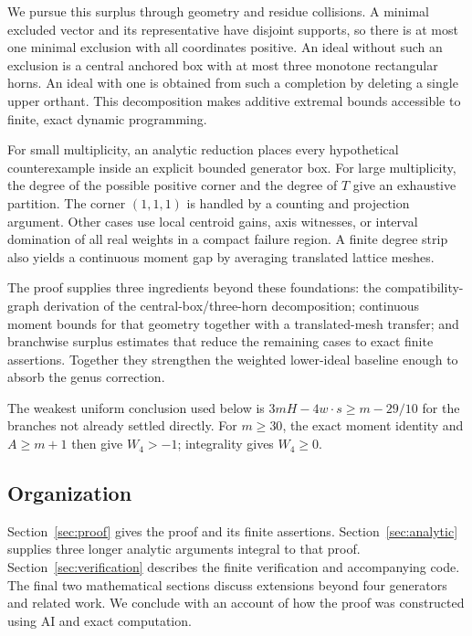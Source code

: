 We pursue this surplus through geometry and residue collisions. A minimal
excluded vector and its representative have disjoint supports, so there
is at most one minimal exclusion with all coordinates positive. An ideal
without such an exclusion is a central anchored box with at most three
monotone rectangular horns. An ideal with one is obtained from such a
completion by deleting a single upper orthant. This decomposition makes
additive extremal bounds accessible to finite, exact dynamic programming.

For small multiplicity, an analytic reduction places every hypothetical
counterexample inside an explicit bounded generator box. For large
multiplicity, the degree of the possible positive corner and the degree
of \(T\) give an exhaustive partition. The corner \((1,1,1)\) is handled
by a counting and projection argument. Other cases use local centroid
gains, axis witnesses, or interval domination of all real weights in a
compact failure region. A finite degree strip also yields a continuous
moment gap by averaging translated lattice meshes.

The proof supplies three ingredients beyond these foundations: the
compatibility-graph derivation of the central-box/three-horn decomposition;
continuous moment bounds for that geometry together with a translated-mesh
transfer; and branchwise surplus estimates that reduce the remaining cases to
exact finite assertions.
Together they strengthen the weighted lower-ideal baseline enough to absorb
the genus correction.

The weakest uniform conclusion used below is
\(3mH-4w\cdot s\ge m-29/10\) for the branches not already settled
directly. For \(m\ge30\), the exact moment identity and \(A\ge m+1\)
then give \(W_4>-1\); integrality gives \(W_4\ge0\).

\subsection{Organization}

Section~\ref{sec:proof} gives the proof and its finite assertions.
Section~\ref{sec:analytic} supplies three longer analytic arguments integral
to that proof. Section~\ref{sec:verification} describes the finite
verification and accompanying code. The final two mathematical sections
discuss extensions beyond four generators and related work. We conclude with an
account of how the proof was constructed using AI and exact computation.
